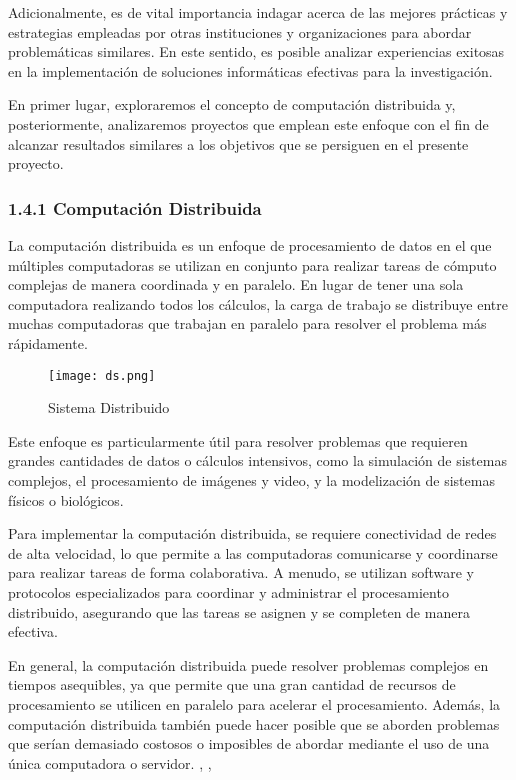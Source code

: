 \begin{spacing}{1.5}
  Adicionalmente, es de vital importancia indagar acerca de las mejores prácticas y estrategias empleadas por otras instituciones y organizaciones para abordar problemáticas similares. En este sentido, es posible analizar experiencias exitosas en la implementación de soluciones informáticas efectivas para la investigación.

  En primer lugar, exploraremos el concepto de computación distribuida y, posteriormente, analizaremos proyectos que emplean este enfoque con el fin de alcanzar resultados similares a los objetivos que se persiguen en el presente proyecto.

  \subsubsection{1.4.1 Computación Distribuida}

  La computación distribuida es un enfoque de procesamiento de datos en el que
  múltiples computadoras se utilizan en conjunto para realizar tareas de cómputo
  complejas de manera coordinada y en paralelo. En lugar de tener una sola
  computadora realizando todos los cálculos, la carga de trabajo se distribuye
  entre muchas computadoras que trabajan en paralelo para resolver el problema
  más rápidamente.

  \begin{figure}[h]
    \centering
    \texttt{[image: ds.png]}
    \caption{Sistema Distribuido}
    \label{fig:etiqueta}
  \end{figure}

  Este enfoque es particularmente útil para resolver problemas que requieren
  grandes cantidades de datos o cálculos intensivos, como la simulación de
  sistemas complejos, el procesamiento de imágenes y video, y la modelización de
  sistemas físicos o biológicos.

  Para implementar la computación distribuida, se requiere conectividad de
  redes de alta velocidad, lo que permite a las computadoras comunicarse y
  coordinarse para realizar tareas de forma colaborativa. A menudo, se utilizan
  software y protocolos especializados para coordinar y administrar el
  procesamiento distribuido, asegurando que las tareas se asignen y se completen
  de manera efectiva.

  En general, la computación distribuida puede resolver problemas complejos en
  tiempos asequibles, ya que permite que una gran cantidad de recursos de
  procesamiento se utilicen en paralelo para acelerar el procesamiento. Además,
  la computación distribuida también puede hacer posible que se aborden problemas
  que serían demasiado costosos o imposibles de abordar mediante el uso de una
  única computadora o servidor. \cite{distributed-1}, \cite{distributed-4},
  \cite{distributed-3}


\end{spacing}
